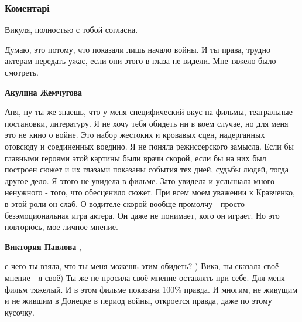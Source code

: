  
 
 
 
 
\subsubsection{Коментарі}
\label{sec:17_08_2021.fb.pavlova_viktoria.1.solncepek.cmt}

\begin{itemize} %
Викуля, полностью с тобой согласна.


Думаю, это потому, что показали лишь начало войны. И ты права, трудно актерам
передать ужас, если они этого в глаза не видели. Мне тяжело было смотреть.

\begin{itemize} %
\textbf{Акулина Жемчугова} 

Аня, ну ты же знаешь, что у меня специфический вкус на фильмы, театральные
постановки, литературу. Я не хочу тебя обидеть ни в коем случае, но для меня
это не кино о войне. Это набор жестоких и кровавых сцен, надерганных отовсюду и
соединенных воедино. Я не поняла режиссерского замысла. Если бы главными
героями этой картины были врачи скорой, если бы на них был построен сюжет и их
глазами показаны события тех дней, судьбы людей, тогда другое дело. Я этого не
увидела в фильме. Зато увидела и услышала много ненужного - того, что
обесценило сюжет. При всем моем уважении к Кравченко, в этой роли он слаб. О
водителе скорой вообще промолчу - просто безэмоциональная игра актера. Он даже
не понимает, кого он играет. Но это повторюсь, мое личное мнение.


\textbf{Виктория Павлова} , 

с чего ты взяла, что ты меня можешь этим обидеть? ) Вика, ты сказала своё
мнение - я своё) Ты же не просила своё мнение оставлять при себе. Для меня
фильм тяжелый. И в этом фильме показана 100\% правда. И многим, не живущим и не
жившим в Донецке в период войны, откроется правда, даже по этому кусочку.


\end{itemize}
\end{itemize}
